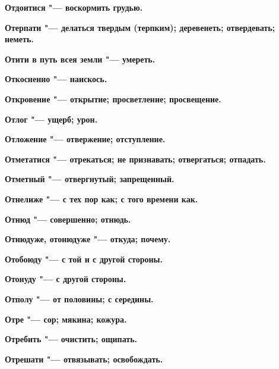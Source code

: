 \bfseries Отдоитися \normalfont{} "--- воскормить грудью. 




\bfseries Отерпати \normalfont{} "--- делаться твердым (терпким); деревенеть; отвердевать; неметь. 




\bfseries Отити в путь всея земли \normalfont{} "--- умереть. 




\bfseries Откосненно \normalfont{} "--- наискось. 




\bfseries Откровение \normalfont{} "--- открытие; просветление; просвещение. 




\bfseries Отлог \normalfont{} "--- ущерб; урон. 




\bfseries Отложение \normalfont{} "--- отвержение; отступление. 




\bfseries Отметатися \normalfont{} "--- отрекаться; не признавать; отвергаться; отпадать. 




\bfseries Отметный \normalfont{} "--- отвергнутый; запрещенный. 




\bfseries Отнелиже \normalfont{} "--- с тех пор как; с того времени как. 




\bfseries Отнюд \normalfont{} "--- совершенно; отнюдь. 




\bfseries Отнюдуже, отонюдуже \normalfont{} "--- откуда; почему. 




\bfseries Отобоюду \normalfont{} "--- с той и с другой стороны. 




\bfseries Отонуду \normalfont{} "--- с другой стороны. 




\bfseries Отполу \normalfont{} "--- от половины; с середины. 




\bfseries Отре \normalfont{} "--- сор; мякина; кожура. 




\bfseries Отребить \normalfont{} "--- очистить; ощипать. 




\bfseries Отрешати \normalfont{} "--- отвязывать; освобождать. 




